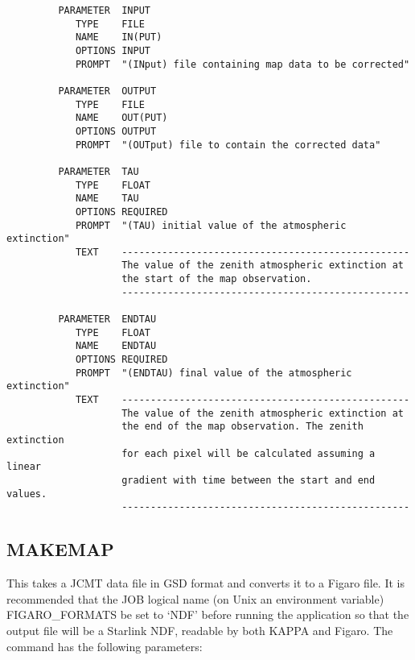 \begin{small}
\begin{verbatim}
         PARAMETER  INPUT
            TYPE    FILE
            NAME    IN(PUT)
            OPTIONS INPUT
            PROMPT  "(INput) file containing map data to be corrected"

         PARAMETER  OUTPUT
            TYPE    FILE
            NAME    OUT(PUT)
            OPTIONS OUTPUT
            PROMPT  "(OUTput) file to contain the corrected data"

         PARAMETER  TAU
            TYPE    FLOAT
            NAME    TAU
            OPTIONS REQUIRED
            PROMPT  "(TAU) initial value of the atmospheric extinction"
            TEXT    --------------------------------------------------
                    The value of the zenith atmospheric extinction at
                    the start of the map observation.
                    --------------------------------------------------

         PARAMETER  ENDTAU
            TYPE    FLOAT
            NAME    ENDTAU
            OPTIONS REQUIRED
            PROMPT  "(ENDTAU) final value of the atmospheric extinction"
            TEXT    --------------------------------------------------
                    The value of the zenith atmospheric extinction at
                    the end of the map observation. The zenith extinction
                    for each pixel will be calculated assuming a linear 
                    gradient with time between the start and end values.
                    --------------------------------------------------
\end{verbatim}
\end{small}


\goodbreak

\subsection{MAKEMAP}

This takes a JCMT data file in GSD format and converts it to a Figaro
file. It is recommended that the JOB logical name (on Unix an
environment variable) FIGARO\_FORMATS be
set  to `NDF' before running the application so that the output file
will be a Starlink NDF, readable by both KAPPA and Figaro. The command
has the following parameters:

\goodbreak

